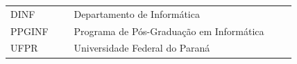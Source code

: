 

\begin{listaabrev}

\begin{longtable}[l]{p{0.2\linewidth}p{0.7\linewidth}}
DINF & Departamento de Informática\\
PPGINF & Programa de Pós-Graduação em Informática\\
UFPR & Universidade Federal do Paraná\\
\end{longtable}

\end{listaabrev}

